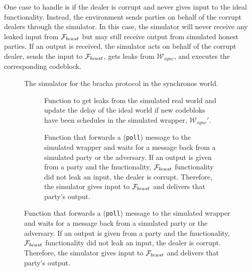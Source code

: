 One case to handle is if the dealer is corrupt and never gives input to the ideal functionality.
Instead, the environment sends parties on behalf of the corrupt dealers through the simulator.
In this case, the simulator will never receive any leaked input from $\mathcal{F}_{bcast}$ but may still receive output from simulated honest parties.
If an output is received, the simulator acts on behalf of the corrupt dealer, sends the input to $\mathcal{F}_{bcast}$, gets leaks from $\mathcal{W}_{sync}$, and executes the corresponding codeblock.

\begin{figure}
	
	\caption{The simulator for the bracha protocol in the synchronos world.}
	\label{fig:sim:bracha_ours}
\end{figure}

\begin{figure}
	\begin{subfigure}{\textwidth}
	
	\label{fig:algo:simgetleaks}
	\caption{Function to get leaks from the simulated real world and update the delay of the ideal world if new codebloks have been schedules in the simulated wrapper, $\mathcal{W}_{sync}'$.}
	\end{subfigure}
	\newline
	\begin{subfigure}{\textwidth}
	
	\label{fig:algo:poll}
	\caption{Function that forwards a (\texttt{poll}) message to the simulated wrapper and waits for a message back from a simulated party or the adversary. If an output is given from a party and the fnuctionality, $\mathcal{F}_{bcast}$ functionality did not leak an input, the dealer is corrupt. Therefore, the simulator gives input to $\mathcal{F}_{bcast}$ and delivers that party's output.}
	\end{subfigure}
\end{figure}
